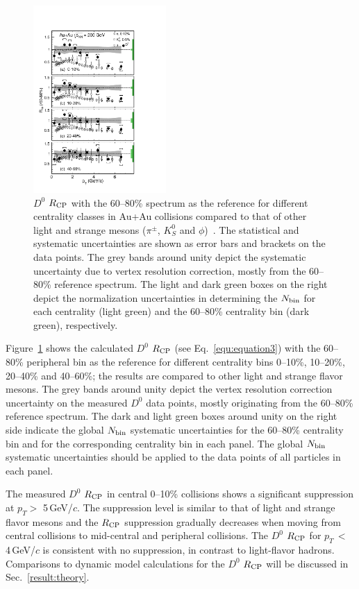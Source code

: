 \documentclass[%
 reprint,	
showpacs,
 amsmath,amssymb,
 aps,
 prc,
]{revtex4-1}
\begin{document}
\begin{figure}
\centering
\includegraphics[width=0.45\textwidth]{fig/D0_Rcp1.pdf}
\caption{$D^{0}$ $R_{\rm CP}$ with the 60--80\% spectrum as the reference for different centrality classes in Au+Au collisions compared to that of other light and strange mesons ($\pi^{\pm}$, $K^0_{S}$ and $\phi$)~\cite{Adams2006_Identified,Abelev2009,Agakishiev2012}. The statistical and systematic uncertainties are shown as error bars and brackets on the data points. The grey bands around unity depict the systematic uncertainty due to vertex resolution correction, mostly from the 60--80\% reference spectrum. The light and dark green boxes on the right depict the normalization uncertainties in determining the $N_{\rm bin}$ for each centrality (light green) and the 60--80\% centrality bin (dark green), respectively.}
\label{fig:D0_Rcp} 
\end{figure}

Figure~\ref{fig:D0_Rcp} shows the calculated $D^0$ $R_{\rm CP}$ (see Eq.~\ref{equ:equation3}) with the 60--80\% peripheral bin as the reference for different centrality bins 0--10\%, 10--20\%, 20--40\% and 40--60\%; the results are compared to other light and strange flavor mesons. The grey bands around unity depict the vertex resolution correction uncertainty on the measured $D^0$ data points, mostly originating from the 60--80\% reference spectrum. The dark and light green boxes around unity on the right side indicate the global $N_{\rm bin}$ systematic uncertainties for the 60--80\% centrality bin and for the corresponding centrality bin in each panel. The global $N_{\rm bin}$ systematic uncertainties should be applied to the data points of all particles in each panel.

The measured $D^0$ $R_{\rm CP}$ in central 0--10\% collisions shows a significant suppression at $p_{T}>$ 5\,GeV/$c$. The suppression level is similar to that of light and strange flavor mesons and the $R_{\rm CP}$ suppression gradually decreases when moving from central collisions to mid-central and peripheral collisions. The $D^0$ $R_{\rm CP}$ for $p_{T}$\,$<$\,4\,GeV/$c$ is consistent with no suppression, in contrast to light-flavor hadrons. Comparisons to dynamic model calculations for the $D^0$ $R_{\rm CP}$ will be discussed in Sec.~\ref{result:theory}.
\end{document}
